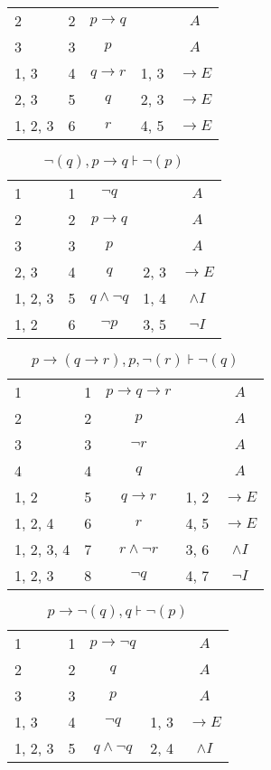 \documentclass{article}
\begin{document}
\begin{table}[htbp]
\begin{tabular}{lllll}
{2} & 2 & $$p→q$$ & {} & $$A$$ \\
{3} & 3 & $$p$$ & {} & $$A$$ \\
{1, 3} & 4 & $$q→r$$ & {1, 3} & $$→E$$ \\
{2, 3} & 5 & $$q$$ & {2, 3} & $$→E$$ \\
{1, 2, 3} & 6 & $$r$$ & {4, 5} & $$→E$$ \\
\end{tabular}
\end{table}\begin{table}[htbp]\caption*{$¬(q),p→q ⊦ ¬(p)$}\centering\begin{tabular}{lllll}
{1} & 1 & $$¬q$$ & {} & $$A$$ \\
{2} & 2 & $$p→q$$ & {} & $$A$$ \\
{3} & 3 & $$p$$ & {} & $$A$$ \\
{2, 3} & 4 & $$q$$ & {2, 3} & $$→E$$ \\
{1, 2, 3} & 5 & $$q∧ ¬q$$ & {1, 4} & $$∧I$$ \\
{1, 2} & 6 & $$¬p$$ & {3, 5} & $$¬I$$ \\
\end{tabular}
\end{table}\begin{table}[htbp]\caption*{$p→(q→r),p,¬(r) ⊦ ¬(q)$}\centering\begin{tabular}{lllll}
{1} & 1 & $$p→q→r$$ & {} & $$A$$ \\
{2} & 2 & $$p$$ & {} & $$A$$ \\
{3} & 3 & $$¬r$$ & {} & $$A$$ \\
{4} & 4 & $$q$$ & {} & $$A$$ \\
{1, 2} & 5 & $$q→r$$ & {1, 2} & $$→E$$ \\
{1, 2, 4} & 6 & $$r$$ & {4, 5} & $$→E$$ \\
{1, 2, 3, 4} & 7 & $$r∧ ¬r$$ & {3, 6} & $$∧I$$ \\
{1, 2, 3} & 8 & $$¬q$$ & {4, 7} & $$¬I$$ \\
\end{tabular}
\end{table}\begin{table}[htbp]\caption*{$p→ ¬(q),q ⊦ ¬(p)$}\centering\begin{tabular}{lllll}
{1} & 1 & $$p→ ¬q$$ & {} & $$A$$ \\
{2} & 2 & $$q$$ & {} & $$A$$ \\
{3} & 3 & $$p$$ & {} & $$A$$ \\
{1, 3} & 4 & $$¬q$$ & {1, 3} & $$→E$$ \\
{1, 2, 3} & 5 & $$q∧ ¬q$$ & {2, 4} & $$∧I$$ \\

\end{tabular}
\end{table}
\end{document}
